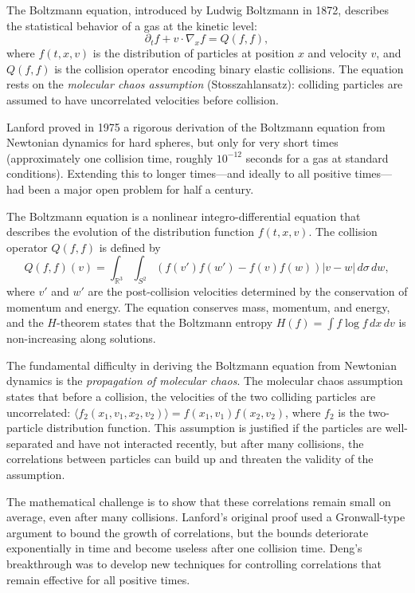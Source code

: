The Boltzmann equation, introduced by Ludwig Boltzmann in 1872, describes the statistical behavior of a gas at the kinetic level:
\[
\partial_t f + v \cdot \nabla_x f = Q(f,f),
\]
where $f(t,x,v)$ is the distribution of particles at position $x$ and velocity $v$, and $Q(f,f)$ is the collision operator encoding binary elastic collisions. The equation rests on the \emph{molecular chaos assumption} (Stosszahlansatz): colliding particles are assumed to have uncorrelated velocities before collision.

Lanford proved in 1975 a rigorous derivation of the Boltzmann equation from Newtonian dynamics for hard spheres, but only for very short times (approximately one collision time, roughly $10^{-12}$ seconds for a gas at standard conditions). Extending this to longer times---and ideally to all positive times---had been a major open problem for half a century.

The Boltzmann equation is a nonlinear integro-differential equation that describes the evolution of the distribution function $f(t,x,v)$. The collision operator $Q(f,f)$ is defined by
\[
Q(f,f)(v) = \int_{\mathbb{R}^3} \int_{S^2} (f(v') f(w') - f(v) f(w)) |v-w| \, d\sigma \, dw,
\]
where $v'$ and $w'$ are the post-collision velocities determined by the conservation of momentum and energy. The equation conserves mass, momentum, and energy, and the $H$-theorem states that the Boltzmann entropy $H(f) = \int f \log f \, dx \, dv$ is non-increasing along solutions.

The fundamental difficulty in deriving the Boltzmann equation from Newtonian dynamics is the \emph{propagation of molecular chaos}. The molecular chaos assumption states that before a collision, the velocities of the two colliding particles are uncorrelated: $\langle f_2(x_1, v_1, x_2, v_2) \rangle = f(x_1, v_1) f(x_2, v_2)$, where $f_2$ is the two-particle distribution function. This assumption is justified if the particles are well-separated and have not interacted recently, but after many collisions, the correlations between particles can build up and threaten the validity of the assumption.

The mathematical challenge is to show that these correlations remain small on average, even after many collisions. Lanford's original proof used a Gronwall-type argument to bound the growth of correlations, but the bounds deteriorate exponentially in time and become useless after one collision time. Deng's breakthrough was to develop new techniques for controlling correlations that remain effective for all positive times.

